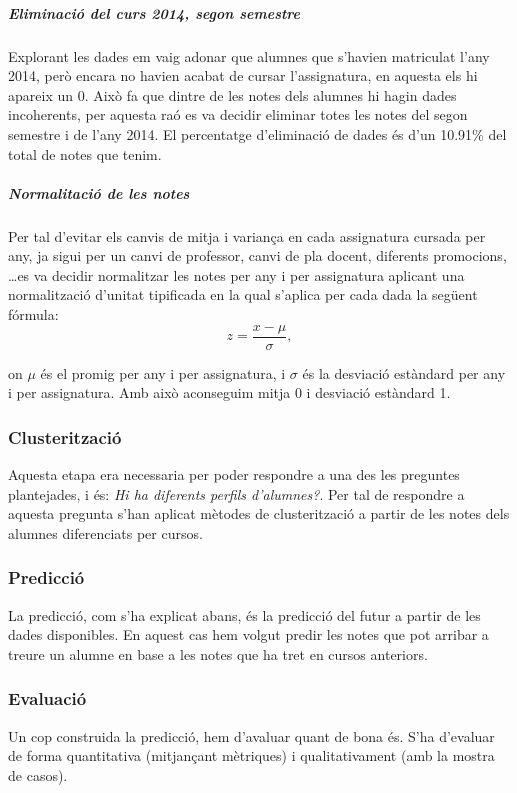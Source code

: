 \documentclass[12pt,a4paper,catalan]{article}
\begin{document}
\subparagraph{Eliminació del curs 2014, segon semestre}
Explorant les dades em vaig adonar que alumnes que s'havien matriculat l'any 2014, però encara no havien acabat de cursar l'assignatura, en aquesta els hi apareix un 0. Això fa que dintre de les notes dels alumnes hi hagin dades incoherents, per aquesta raó es va decidir eliminar totes les notes del segon semestre i de l'any 2014. El percentatge d'eliminació de dades és d'un 10.91\% del total de notes que tenim.

\subparagraph{Normalitació de les notes}
Per tal d'evitar els canvis de mitja i variança en cada assignatura cursada per any, ja sigui per un canvi de professor, canvi de pla docent, diferents promocions, \ldots es va decidir normalitzar les notes per any i per assignatura aplicant una normalització d'unitat tipificada en la qual s'aplica per cada dada la següent fórmula:
$$ z = \frac{x - \mu}{\sigma}, $$

on $\mu$ és el promig per any i per assignatura, i $\sigma$ és la desviació estàndard per any i per assignatura. Amb això aconseguim mitja 0 i desviació estàndard 1.

\subsubsection{Clusterització}
Aquesta etapa era necessaria per poder respondre a una des les preguntes plantejades, i és: \textit{Hi ha diferents perfils d'alumnes?}. Per tal de  respondre a aquesta pregunta s'han aplicat mètodes de clusterització a partir de les notes dels alumnes diferenciats per cursos.

\subsubsection{Predicció}
La predicció, com s'ha explicat abans, és la predicció del futur a partir de les dades disponibles. En aquest cas hem volgut predir les notes que pot arribar a treure un alumne en base a les notes que ha tret en cursos anteriors.

\subsubsection{Evaluació}
Un cop construida la predicció, hem d'avaluar quant de bona és. S'ha d'evaluar de forma quantitativa (mitjançant mètriques) i qualitativament (amb la mostra de casos).

\newpage
\end{document}
